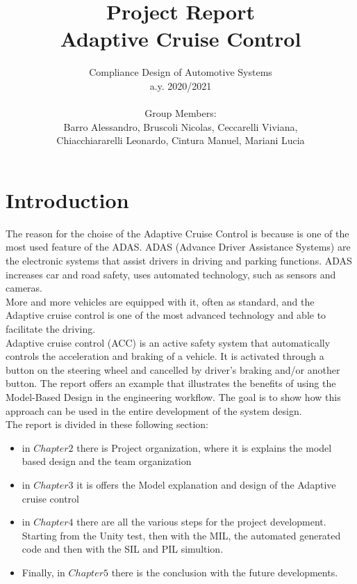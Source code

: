 \documentclass[12pt,a4paper]{report}
\begin{document}
	
	\author{Compliance Design of Automotive Systems \\
		a.y. 2020/2021\\\\
		Group Members:\\
		Barro Alessandro, Bruscoli Nicolas, Ceccarelli Viviana, \\
		Chiacchiararelli Leonardo, Cintura Manuel, Mariani Lucia\\
	}
	\title{Project Report\\
		Adaptive Cruise Control
	}
	\maketitle
	
\tableofcontents
\listoffigures


\chapter{Introduction}
The reason for the choise of the Adaptive Cruise Control is because is one of the most used feature of the ADAS. ADAS (Advance Driver Assistance Systems) are the electronic systems that assist drivers in driving and parking functions. ADAS increases car and road safety, uses automated technology, such as sensors and cameras.\\ More and more vehicles are equipped with it, often as standard, and the Adaptive cruise control is one of the most advanced technology and able to facilitate the driving.\\
Adaptive cruise control (ACC) is an active safety system that automatically controls the acceleration and braking of a vehicle. It is activated through a button on the steering wheel and cancelled by driver’s braking and/or another button.
The report offers an example that illustrates the benefits of using the Model-Based Design in the engineering workflow.
The goal is to show how this approach can be used in the entire development of the system design.\\
The report is divided in these following section:
\begin{itemize}
	\item in $Chapter 2$ there is Project organization, where it is explains the model based design and the team organization
	\item in $Chapter 3$ it is offers the Model explanation and design of the Adaptive cruise control
	\item in $Chapter 4$ there are all the various steps for the project development. Starting from the Unity test, then with the MIL, the automated generated code and then with the SIL and PIL simultion.
	\item Finally, in $Chapter 5$ there is the conclusion with the future developments.
\end{itemize}
\end{document}
